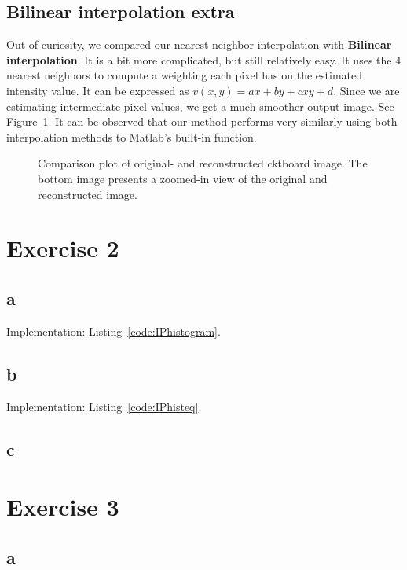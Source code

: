 \documentclass{article}
\begin{document}
\subsection*{Bilinear interpolation extra}
Out of curiosity, we compared our nearest neighbor interpolation with \textbf{Bilinear interpolation}. It is a bit more complicated, but still relatively easy. It uses the 4 nearest neighbors to compute a weighting each pixel has on the estimated intensity value. It can be expressed as $v(x, y) = ax + by + cxy + d$. Since we are estimating intermediate pixel values, we get a much smoother output image. See Figure~\ref{fig:bilinear}. It can be observed that our method performs very similarly using both interpolation methods to Matlab's built-in function.

\begin{figure}[ht]
    \centering
    
    \caption{Comparison plot of original- and reconstructed cktboard image. The bottom image presents a zoomed-in view of the original and reconstructed image.}
    \label{fig:bilinear}
\end{figure}

\section*{Exercise 2}
\subsection*{a}  Implementation: Listing~\ref{code:IPhistogram}.

\subsection*{b}  Implementation: Listing~\ref{code:IPhisteq}.

\subsection*{c}


\section*{Exercise 3}
\subsection*{a}
\end{document}
